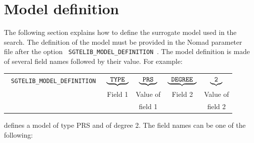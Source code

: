 \documentclass[12pt]{article}
\newcommand{\nomad}{{\sf Nomad}\xspace}
\begin{document}
\newcommand{\myUnderline}[1]{\textbf{#1}:}

\section{Model definition}
\label{sec:model-definition}

  The following section explains how to define the surrogate model used in the search. The definition of the model must be provided in the \nomad parameter file after the option {\tt~SGTELIB\_MODEL\_DEFINITION~}. The model definition is made of several field names followed by their value. For example:
\begin{center}
  \begin{tabular}{c c c c c}
      {\tt~SGTELIB\_MODEL\_DEFINITION~} & 
          $\underbrace{\text{\tt~TYPE~}}$ & 
          $\underbrace{\text{\tt~PRS~}}$ & 
          $\underbrace{\text{\tt~DEGREE~}}$ & 
          $\underbrace{\text{\tt~2~}}$ \\
      & Field 1 & Value of & Field 2 & Value of  \\
      &         & field 1  &         & field 2 \\
  \end{tabular}
\end{center}
defines a model of type PRS and of degree 2. The field names can be one of the following:
\end{document}
